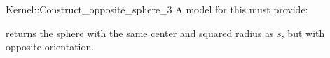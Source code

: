 \begin{ccRefFunctionObjectConcept}{Kernel::Construct_opposite_sphere_3}
A model for this must provide:


{ returns the sphere with the same center and squared radius as
  $s$, but with opposite orientation.}

\ccIsModel{}

\end{ccRefFunctionObjectConcept}

